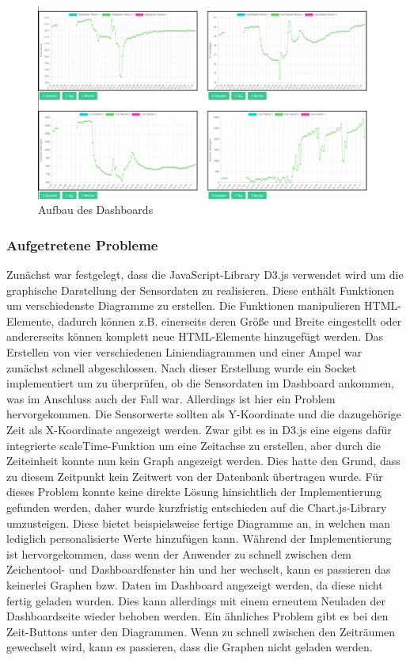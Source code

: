 \documentclass[]{article}
\begin{document}
			\begin{figure}[h]
				\centering
				\includegraphics[scale=0.40]{images/Dashboardbild}
				\caption{Aufbau des Dashboards}
				\label{img:Dashboardbild}
			\end{figure}
			
			\subsubsection{Aufgetretene Probleme}
			Zunächst war festgelegt, dass die JavaScript-Library D3.js verwendet wird um die graphische Darstellung der Sensordaten zu realisieren. Diese enthält Funktionen um verschiedenste Diagramme zu erstellen. Die Funktionen manipulieren HTML-Elemente, dadurch können z.B. einerseits deren Größe und Breite eingestellt oder andererseits können komplett neue HTML-Elemente hinzugefügt werden. Das Erstellen von vier verschiedenen Liniendiagrammen und einer Ampel war zunächst schnell abgeschlossen. Nach dieser Erstellung wurde ein Socket implementiert um zu überprüfen, ob die Sensordaten im Dashboard ankommen, was im Anschluss auch der Fall war. Allerdings ist hier ein Problem hervorgekommen.\newline
			Die Sensorwerte sollten als Y-Koordinate und die dazugehörige Zeit als X-Koordinate angezeigt werden. Zwar gibt es in D3.js eine eigens dafür integrierte scaleTime-Funktion um eine Zeitachse zu erstellen, aber durch die Zeiteinheit konnte nun kein Graph angezeigt werden. Dies hatte den Grund, dass zu diesem Zeitpunkt kein Zeitwert von der Datenbank übertragen wurde. Für dieses Problem konnte keine direkte Lösung hinsichtlich der Implementierung gefunden werden, daher wurde kurzfristig entschieden auf die Chart.js-Library umzusteigen. Diese bietet beispielsweise fertige Diagramme an, in welchen man lediglich personalisierte Werte hinzufügen kann.\newline 
			Während der Implementierung ist hervorgekommen, dass wenn der Anwender zu schnell zwischen dem Zeichentool- und Dashboardfenster hin und her wechselt, kann es passieren das keinerlei Graphen bzw. Daten im Dashboard angezeigt werden, da diese nicht fertig geladen wurden. Dies kann allerdings mit einem erneutem Neuladen der Dashboardseite wieder behoben werden. Ein ähnliches Problem gibt es bei den Zeit-Buttons unter den Diagrammen. Wenn zu schnell zwischen den Zeiträumen gewechselt wird, kann es passieren, dass die Graphen nicht geladen werden.
\end{document}
